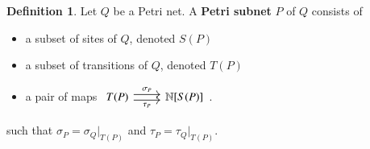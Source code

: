 \documentclass[aps,prd,onecolumn,nofootinbib,letterpaper,preprintnumbers,superscriptaddress,eqsecnum]{revtex4}
\theoremstyle{definition}
\newtheorem{definition}{Definition}
\newcommand{\N}{\mathbb{N}}
\begin{document}
\begin{definition}\label{def:subnet}
    Let $Q$ be a Petri net. A \textbf{Petri subnet} $P$ of $Q$ consists of
    \begin{itemize}
        \item a subset of sites of $Q$, denoted $S(P)$
        \item a subset of transitions of $Q$, denoted $T(P)$
        \item a pair of maps $\begin{tikzcd}
                T(P)
                \arrow[r, shift left = 1, "\sigma_P"]
                \arrow[r, shift right = 1, "\tau_P", swap]
                &
                \N[S(P)]
        \end{tikzcd}$.
    \end{itemize}
    such that $\sigma_P = \sigma_Q|_{T(P)}$ and $\tau_P = \tau_Q|_{T(P)}$.
\end{definition}
\end{document}
